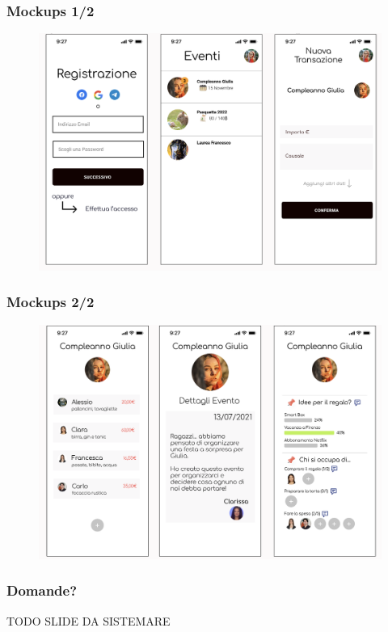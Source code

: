 \documentclass[11pt]{beamer}
\begin{document}
	\begin{frame}
		\frametitle{Mockups 1/2}
		\begin{figure}[h]
			\centering
			\includegraphics[width=.8\linewidth]{mock.png}
		\end{figure}
	\end{frame}

	\begin{frame}
		\frametitle{Mockups 2/2}
		\begin{figure}[h]
			\centering
			\includegraphics[width=.8\linewidth]{mock2.png}
		\end{figure}
	\end{frame}

	\begin{frame}
		\frametitle{Domande?}
		TODO SLIDE DA SISTEMARE 
	\end{frame}
\end{document}
